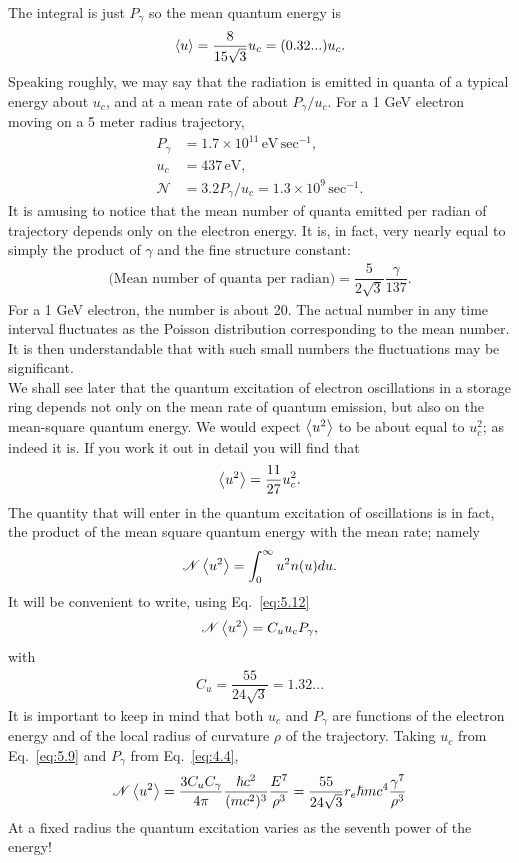 \documentclass[../sands-adaptation.tex]{subfiles}
\begin{document}
The integral is just $P_\gamma$ so the mean quantum energy is
\begin{align}
	\left< u \right> = \dfrac{8}{15\sqrt{3}} u_c = (0.32...) u_c.
\end{align}
Speaking roughly, we may say that the radiation is emitted in quanta of a typical energy about $u_c$, and at a mean rate of about $P_\gamma/u_c$. For a 1 GeV electron moving on a 5 meter radius trajectory,
\begin{align*}
	P_\gamma &= 1.7 \times 10^{11}\, \text{eV}\,\text{sec}^{-1},\\
    u_c &= 437\, \text{eV},\\
    \mathscr{N} &= 3.2 P_\gamma / u_c = 1.3 \times 10^9\, \text{sec}^{-1}.
\end{align*}
It is amusing to notice that the mean number of quanta emitted per radian of trajectory depends only on the electron energy. It is, in fact, very nearly equal to simply the product of $\gamma$ and the fine structure constant:
\begin{align}
	\text{(Mean number of quanta per radian)} = \dfrac{5}{2\sqrt{3}} \dfrac{\gamma}{137}.
\end{align}
For a 1 GeV electron, the number is about 20. The actual number in any time interval fluctuates
 as the Poisson distribution corresponding to the mean number. It is then understandable
 that with such small numbers the fluctuations may be significant.\\
 We shall see later that the quantum excitation of electron oscillations in a storage ring depends not only on the mean rate of quantum emission, but also on the mean-square quantum energy. We would expect $\left< u^2 \right>$ to be about equal to $u_c^2$; as indeed it is.
 If you work it out in detail you will find that
\begin{align}
	\left< u^2 \right> = \dfrac{11}{27} u_c^2.
\end{align}
The quantity that will enter in the quantum excitation of oscillations is in fact, the product of the mean square quantum energy with the mean rate; namely
\begin{align} \label{eq:5.17}
	\mathscr{N} \left< u^2 \right> = \int_0^\infty u^2 n(u) du.
\end{align}
It will be convenient to write, using Eq.~\eqref{eq:5.12}
\begin{align} \label{eq:5.18}
	\mathscr{N} \left< u^2 \right> = C_u u_c P_\gamma,
\end{align}
with
\begin{align}
	C_u = \dfrac{55}{24\sqrt{3}} = 1.32...
\end{align}
It is important to keep in mind that both $u_c$ and $P_\gamma$ are functions of the electron
energy and of the local radius of curvature $\rho$ of the trajectory. Taking $u_c$ from Eq.~\eqref{eq:5.9} and $P_\gamma$ from Eq.~\eqref{eq:4.4},
\begin{align}
	\mathscr{N} \left< u^2 \right> = \dfrac{3 C_u C_\gamma}{4 \pi} \dfrac{\hslash c^2}{(mc^2)^3} \dfrac{E^7}{\rho^3} = \dfrac{55}{24\sqrt{3}} r_e \hslash mc^4 \dfrac{\gamma^7}{\rho^3}
\end{align}
At a fixed radius the quantum excitation varies as the seventh power of the energy!
\end{document}

